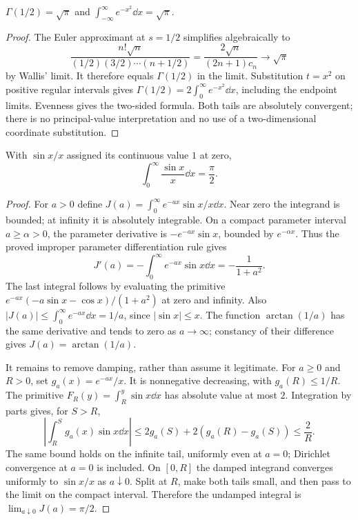 \begin{theorem}
$\Gamma(1/2)=\sqrt\pi$ and $\int_{-\infty}^{\infty}e^{-x^2}\dd x=\sqrt\pi$.
\end{theorem}
\begin{proof}
The Euler approximant at $s=1/2$ simplifies algebraically to
\[
 \frac{n!\sqrt n}{(1/2)(3/2)\cdots(n+1/2)}
 =\frac{2\sqrt n}{(2n+1)c_n}\longrightarrow\sqrt\pi
\]
by Wallis' limit. It therefore equals $\Gamma(1/2)$ in the limit.
Substitution $t=x^2$ on positive regular intervals gives
$\Gamma(1/2)=2\int_0^\infty e^{-x^2}\dd x$, including the endpoint limits.
Evenness gives the two-sided formula. Both tails are absolutely convergent;
there is no principal-value interpretation and no use of a two-dimensional
coordinate substitution.
\end{proof}

\begin{theorem}
With $\sin x/x$ assigned its continuous value $1$ at zero,
\[
 \int_0^\infty\frac{\sin x}{x}\dd x=\frac\pi2.
\]
\end{theorem}
\begin{proof}
For $a>0$ define $J(a)=\int_0^\infty e^{-ax}\sin x/x\dd x$.
Near zero the integrand is bounded; at infinity it is absolutely integrable.
On a compact parameter interval $a\geq\alpha>0$, the parameter derivative
is $-e^{-ax}\sin x$, bounded by $e^{-\alpha x}$. Thus the proved improper
parameter differentiation rule gives
\[
 J'(a)=-\int_0^\infty e^{-ax}\sin x\dd x=-\frac1{1+a^2}.
\]
The last integral follows by evaluating the primitive
$e^{-ax}(-a\sin x-\cos x)/(1+a^2)$ at zero and infinity.
Also $|J(a)|\leq\int_0^\infty e^{-ax}\dd x=1/a$, since $|\sin x|\leq x$.
The function $\arctan(1/a)$ has the same derivative and tends to zero as
$a\to\infty$; constancy of their difference gives $J(a)=\arctan(1/a)$.

It remains to remove damping, rather than assume it legitimate. For $a\geq0$
and $R>0$, set $g_a(x)=e^{-ax}/x$. It is nonnegative decreasing, with
$g_a(R)\leq1/R$. The primitive $F_R(y)=\int_R^y\sin x\dd x$ has absolute
value at most $2$. Integration by parts gives, for $S>R$,
\[
 \left|\int_R^S g_a(x)\sin x\dd x\right|
 \leq2g_a(S)+2(g_a(R)-g_a(S))\leq\frac2R.
\]
The same bound holds on the infinite tail, uniformly even at $a=0$;
Dirichlet convergence at $a=0$ is included. On $[0,R]$ the damped integrand
converges uniformly to $\sin x/x$ as $a\downarrow0$. Split at $R$, make both
tails small, and then pass to the limit on the compact interval. Therefore
the undamped integral is $\lim_{a\downarrow0}J(a)=\pi/2$.
\end{proof}

